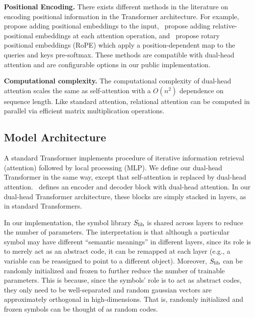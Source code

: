 \textbf{Positional Encoding.} There exists different methods in the literature on encoding positional information in the Transformer architecture. For example,~\citet{vaswani2017attention} propose adding positional embeddings to the input,~\citet{shawSelfAttentionRelativePosition2018b} propose adding relative-positional embeddings at each attention operation, and~\citet{suRoFormerEnhancedTransformer2023} propose rotary positional embeddings (RoPE) which apply a position-dependent map to the queries and keys pre-softmax. These methods are compatible with dual-head attention and are configurable options in our public implementation.

\textbf{Computational complexity.} The computational complexity of dual-head attention scales the same as self-attention with a $O(n^2)$ dependence on sequence length. Like standard attention, relational attention can be computed in parallel via efficient matrix multiplication operations.

\subsection{Model Architecture}

A standard Transformer implements procedure of iterative information retrieval (attention) followed by local processing (MLP). We define our dual-head Transformer in the same way, except that self-attention is replaced by dual-head attention.~ defines an encoder and decoder block with dual-head attention. In our dual-head Transformer architecture, these blocks are simply stacked in layers, as in standard Transformers.

\begin{remark}
    In our implementation, the symbol library $S_\mathrm{lib}$ is shared across layers to reduce the number of parameters. The interpretation is that although a particular symbol may have different ``semantic meanings'' in different layers, since its role is to merely act as an abstract code, it can be remapped at each layer (e.g., a variable can be reassigned to point to a different object). Moreover, $S_\mathrm{lib}$ can be randomly initialized and frozen to further reduce the number of trainable parameters. This is because, since the symbols' role is to act as abstract codes, they only need to be well-separated and random gaussian vectors are approximately orthogonal in high-dimensions. That is, randomly initialized and frozen symbols can be thought of as random codes.
\end{remark}

